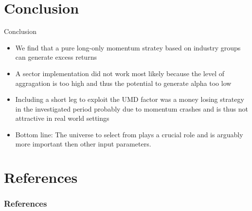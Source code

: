 \documentclass{beamer}
\begin{document}
\section{Conclusion}
\begin{frame}{Conclusion}    
\begin{itemize}
    \item We find that a pure long-only momentum stratey based on industry groups can generate excess returns
    \item A sector implementation did not work most likely because the level of aggragation is too high and thus the potential to generate alpha too low
    \item Including a short leg to exploit the UMD factor was a money losing strategy in the investigated period probably due to momentum crashes and is thus not attractive in real world settings
    \item Bottom line: The universe to select from plays a crucial role and is arguably more important then other input parameters.
    
    
    
\end{itemize}
\end{frame}





\section{References}
\begin{frame}[allowframebreaks]\frametitle{References}
        
        
\end{frame}
\end{document}

